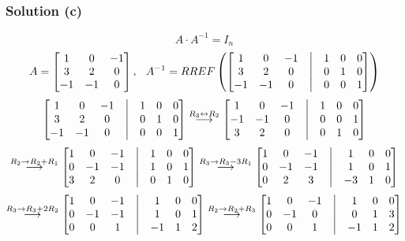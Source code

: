 \documentclass[12pt]{article}
\begin{document}
\subsubsection*{Solution (c)}
\[
  A \cdot A^{-1} = I_{n}
\]
\[
  A = 
  \begin{bmatrix}
    1 & 0 & -1\\ 
    3 & 2 & 0\\ 
    -1 & -1 & 0 
  \end{bmatrix}, \hspace{0.1in}
  A^{-1} = RREF\left(
    \begin{bmatrix}
      1 & 0 & -1 & \bigm| & 1 & 0 & 0\\ 
      3 & 2 & 0 & \bigm| & 0 & 1 & 0\\ 
      -1 & -1 & 0 & \bigm| & 0 & 0 & 1 
    \end{bmatrix}\right)
\]
\[
  \begin{bmatrix}
    1 & 0 & -1 & \bigm| & 1 & 0 & 0\\ 
    3 & 2 & 0 & \bigm| & 0 & 1 & 0\\ 
    -1 & -1 & 0 & \bigm| & 0 & 0 & 1 
  \end{bmatrix}
  \overset{R_3 \leftrightarrow R_2}{\longrightarrow}
  \begin{bmatrix}
    1 & 0 & -1 & \bigm| & 1 & 0 & 0\\ 
    -1 & -1 & 0 & \bigm| & 0 & 0 & 1\\ 
    3 & 2 & 0 & \bigm| & 0 & 1 & 0 
  \end{bmatrix}
\]
\[
  \overset{R_2 \rightarrow R_2 + R_1}{\longrightarrow}
  \begin{bmatrix}
    1 & 0 & -1 & \bigm| & 1 & 0 & 0\\ 
    0 & -1 & -1 & \bigm| & 1 & 0 & 1\\ 
    3 & 2 & 0 & \bigm| & 0 & 1 & 0 
  \end{bmatrix}
  \overset{R_3 \rightarrow R_3 - 3R_1}{\longrightarrow}
  \begin{bmatrix}
    1 & 0 & -1 & \bigm| & 1 & 0 & 0\\ 
    0 & -1 & -1 & \bigm| & 1 & 0 & 1\\ 
    0 & 2 & 3 & \bigm| & -3 & 1 & 0 
  \end{bmatrix}
\]
\[
  \overset{R_3 \rightarrow R_3 + 2R_2}{\longrightarrow}
  \begin{bmatrix}
    1 & 0 & -1 & \bigm| & 1 & 0 & 0\\ 
    0 & -1 & -1 & \bigm| & 1 & 0 & 1\\ 
    0 & 0 & 1 & \bigm| & -1 & 1 & 2 
  \end{bmatrix}
  \overset{R_2 \rightarrow R_2 + R_3}{\longrightarrow}
  \begin{bmatrix}
    1 & 0 & -1 & \bigm| & 1 & 0 & 0\\ 
    0 & -1 & 0 & \bigm| & 0 & 1 & 3\\ 
    0 & 0 & 1 & \bigm| & -1 & 1 & 2 
  \end{bmatrix}
\]
\end{document}
